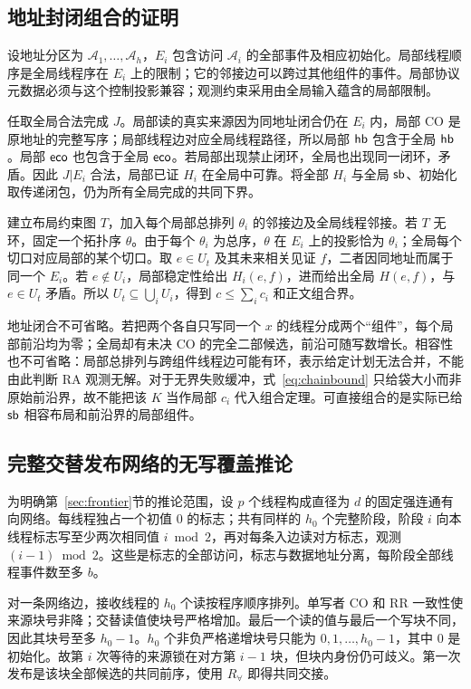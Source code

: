 \subsection{地址封闭组合的证明}\label{app:composition}
设地址分区为 $\mathcal A_1,\ldots,\mathcal A_h$，$E_i$ 包含访问 $\mathcal A_i$ 的全部事件及相应初始化。局部线程顺序是全局线程序在 $E_i$ 上的限制；它的邻接边可以跨过其他组件的事件。局部协议元数据必须与这个控制投影兼容；观测约束采用由全局输入蕴含的局部限制。

任取全局合法完成 $J$。局部读的真实来源因为同地址闭合仍在 $E_i$ 内，局部 CO 是原地址的完整写序；局部线程边对应全局线程路径，所以局部 $\mathsf{hb}$ 包含于全局 $\mathsf{hb}$。局部 $\mathsf{eco}$ 也包含于全局 $\mathsf{eco}$。若局部出现禁止闭环，全局也出现同一闭环，矛盾。因此 $J|E_i$ 合法，局部已证 $H_i$ 在全局中可靠。将全部 $H_i$ 与全局 $\mathsf{sb}$、初始化取传递闭包，仍为所有全局完成的共同下界。

建立布局约束图 $T$，加入每个局部总排列 $\theta_i$ 的邻接边及全局线程邻接。若 $T$ 无环，固定一个拓扑序 $\theta$。由于每个 $\theta_i$ 为总序，$\theta$ 在 $E_i$ 上的投影恰为 $\theta_i$；全局每个切口对应局部的某个切口。取 $e\in U_t$ 及其未来相关见证 $f$，二者因同地址而属于同一个 $E_i$。若 $e\notin U_i$，局部稳定性给出 $H_i(e,f)$，进而给出全局 $H(e,f)$，与 $e\in U_t$ 矛盾。所以 $U_t\subseteq\bigcup_i U_i$，得到 $c\le\sum_i c_i$ 和正文组合界。

地址闭合不可省略。若把两个各自只写同一个 $x$ 的线程分成两个“组件”，每个局部前沿均为零；全局却有未决 CO 的完全二部候选，前沿可随写数增长。相容性也不可省略：局部总排列与跨组件线程边可能有环，表示给定计划无法合并，不能由此判断 RA 观测无解。对于无界失败缓冲，式~\eqref{eq:chainbound} 只给袋大小而非原始前沿界，故不能把该 $K$ 当作局部 $c_i$ 代入组合定理。可直接组合的是实际已给 $\mathsf{sb}$ 相容布局和前沿界的局部组件。

\subsection{完整交替发布网络的无写覆盖推论}\label{app:publication}
为明确第~\ref{sec:frontier}节的推论范围，设 $p$ 个线程构成直径为 $d$ 的固定强连通有向网络。每线程独占一个初值 $0$ 的标志；共有同样的 $h_0$ 个完整阶段，阶段 $i$ 向本线程标志写至少两次相同值 $i\bmod2$，再对每条入边读对方标志，观测 $(i-1)\bmod2$。这些是标志的全部访问，标志与数据地址分离，每阶段全部线程事件数至多 $b$。

对一条网络边，接收线程的 $h_0$ 个读按程序顺序排列。单写者 CO 和 RR 一致性使来源块号非降；交替读值使块号严格增加。最后一个读的值与最后一个写块不同，因此其块号至多 $h_0-1$。$h_0$ 个非负严格递增块号只能为 $0,1,\ldots,h_0-1$，其中 $0$ 是初始化。故第 $i$ 次等待的来源锁在对方第 $i-1$ 块，但块内身份仍可歧义。第一次发布是该块全部候选的共同前序，使用 $R_\forall$ 即得共同交接。

